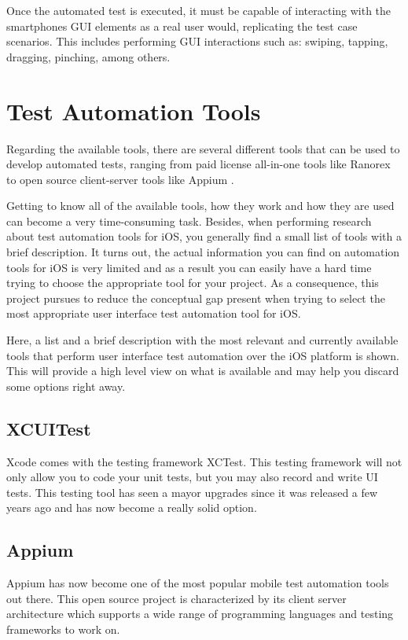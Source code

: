 Once the automated test is executed, it must be capable of interacting with the smartphones GUI elements as a real user would, replicating the test case scenarios. This includes performing GUI interactions such as: swiping, tapping, dragging, pinching, among others.


\section{Test Automation Tools}

Regarding the available tools, there are several different tools that can be used to develop automated tests, ranging from paid license all-in-one tools like Ranorex \cite{Ranorex} to open source client-server tools like Appium \cite{Appium}. 

Getting to know all of the available tools, how they work and how they are used can become a very time-consuming task. Besides, when performing research about test automation tools for iOS, you generally find a small list of tools with a brief description. It turns out, the actual information you can find on automation tools for iOS is very limited and as a result you can easily have a hard time trying to choose the appropriate tool for your project. As a consequence, this project pursues to reduce the conceptual gap present when trying to select the most appropriate user interface test automation tool for iOS.

Here, a list and a brief description with the most relevant and currently available tools that perform user interface test automation over the iOS platform is shown. This will provide a high level view on what is available and may help you discard some options right away.

\subsection {XCUITest}
Xcode comes with the testing framework XCTest. This testing framework will not only allow you to code your unit tests, but you may also record and write UI tests. This testing tool has seen a mayor upgrades since it was released a few years ago and has now become a really solid option. \cite{XCUITest}

\subsection {Appium}
Appium has now become one of the most popular mobile test automation tools out there. This open source project is characterized by its client server architecture which supports a wide range of programming languages and testing frameworks to work on. \cite{Appium}

